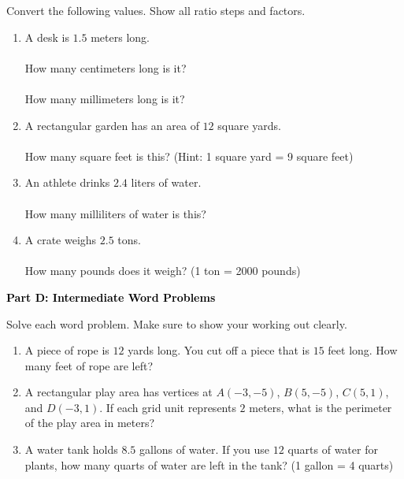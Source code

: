 \documentclass[12pt, letterpaper, fleqn]{article}
\newcommand{\blanklong}{\underline{\hspace{6.5cm}}}
\newcommand{\blankshorter}{\underline{\hspace{1.5cm}}}
\begin{document}
\vspace{3mm}

\noindent
Convert the following values. Show all ratio steps and factors.

\vspace{5mm}

\begin{enumerate}[itemsep=2.5cm, leftmargin=0.6cm]
\item A desk is $1.5$ meters long. \\ \\
How many centimeters long is it? \blanklong \\ \\
How many millimeters long is it? \blanklong

\item A rectangular garden has an area of $12$ square yards. \\ \\
How many square feet is this? (Hint: 1 square yard = 9 square feet)   \blankshorter

\item An athlete drinks $2.4$ liters of water. \\ \\
How many milliliters of water is this? \blanklong

\item A crate weighs $2.5$ tons. \\ \\
How many pounds does it weigh? (1 ton = 2000 pounds) \blanklong
\end{enumerate}

\newpage

\begin{tcolorbox}[colback=black!10]
    \large\textcolor{black}{\textbf{Part D: Intermediate Word Problems}}
\end{tcolorbox}

\vspace{3mm}

\noindent
Solve each word problem. Make sure to show your working out clearly.

\vspace{5mm}

\begin{enumerate}[itemsep=4cm, leftmargin=0.6cm]
\item A piece of rope is $12$ yards long. You cut off a piece that is $15$ feet long. How many feet of rope are left?
\vspace{1cm}

\item A rectangular play area has vertices at $A(-3, -5)$, $B(5, -5)$, $C(5, 1)$, and $D(-3, 1)$. If each grid unit represents $2$ meters, what is the perimeter of the play area in meters?
\vspace{1cm}

\item A water tank holds $8.5$ gallons of water. If you use $12$ quarts of water for plants, how many quarts of water are left in the tank? (1 gallon = 4 quarts)
\end{enumerate}
\end{document}
